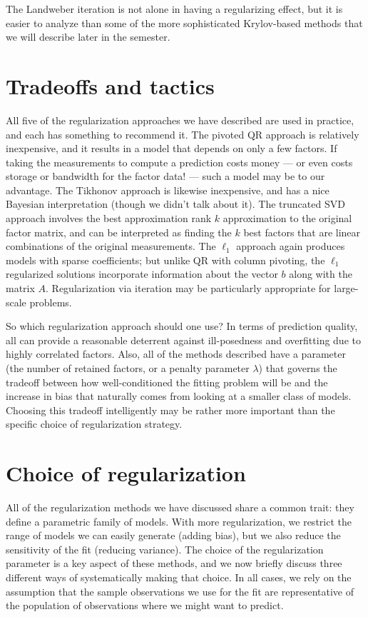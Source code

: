 \documentclass[12pt, leqno]{article} %
\begin{document}
The Landweber iteration is not alone in having a regularizing effect,
but it is easier to analyze than some of the more sophisticated
Krylov-based methods that we will describe later in the semester.

\section{Tradeoffs and tactics}

All five of the regularization approaches we have described are used
in practice, and each has something to recommend it.  The pivoted QR
approach is relatively inexpensive, and it results in a model that
depends on only a few factors.  If taking the measurements to compute
a prediction costs money --- or even costs storage or bandwidth for
the factor data! --- such a model may be to our advantage.  The
Tikhonov approach is likewise inexpensive, and has a nice Bayesian
interpretation (though we didn't talk about it).  The truncated SVD
approach involves the best approximation rank $k$ approximation to the
original factor matrix, and can be interpreted as finding the $k$ best
factors that are linear combinations of the original measurements.
The $\ell_1$ approach again produces models with sparse coefficients;
but unlike QR with column pivoting, the $\ell_1$ regularized solutions
incorporate information about the vector $b$ along with the matrix $A$.
Regularization via iteration may be particularly appropriate for
large-scale problems.

So which regularization approach should one use?  In terms of
prediction quality, all can provide a reasonable deterrent against
ill-posedness and overfitting due to highly correlated factors.  Also,
all of the methods described have a parameter (the number of retained
factors, or a penalty parameter $\lambda$) that governs the tradeoff
between how well-conditioned the fitting problem will be and the
increase in bias that naturally comes from looking at a smaller class
of models.  Choosing this tradeoff intelligently may be rather more
important than the specific choice of regularization strategy.

\section{Choice of regularization}

All of the regularization methods we have discussed share a common
trait: they define a parametric family of models.  With more
regularization, we restrict the range of models we can easily generate
(adding bias), but we also reduce the sensitivity of the fit (reducing
variance). The choice of the regularization parameter is a key aspect of
these methods, and we now briefly discuss three different ways of
systematically making that choice.  In all cases, we
rely on the assumption that the sample observations we use for the
fit are representative of the population of observations where we might
want to predict.
\end{document}
